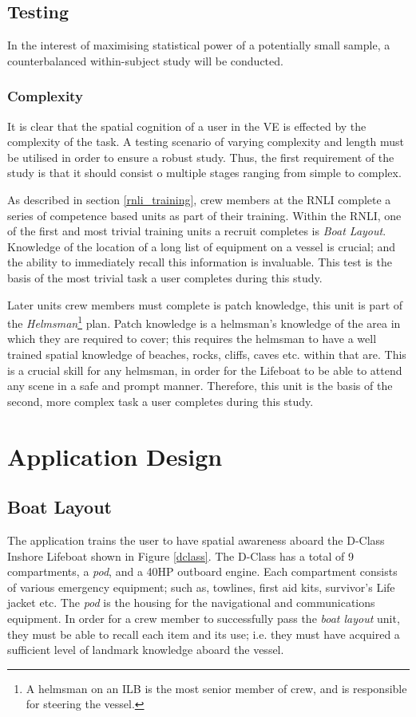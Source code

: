 \documentclass[a4paper, openright, twoside]{report}
\begin{document}
\subsection{Testing}
In the interest of maximising statistical power of a potentially small sample, a counterbalanced within-subject study will be conducted. 

\subsubsection{Complexity}
It is clear that the spatial cognition of a user in the VE is effected by the complexity of the task. A testing scenario of varying complexity and length must be utilised in order to ensure a robust study. Thus, the first requirement of the study is that it should consist o multiple stages ranging from simple to complex. 

As described in section \ref{rnli_training}, crew members at the RNLI complete a series of competence based units as part of their training.  Within the RNLI, one of the first and most trivial training units a recruit completes is \textit{Boat Layout}. Knowledge of the location of a long list of equipment on a vessel is crucial; and the ability to immediately recall this information is invaluable. This test is the basis of the most trivial task a user completes during this study. 

Later units crew members must complete is patch knowledge, this unit is part of the \textit{Helmsman}\footnote{A helmsman on an ILB is the most senior member of crew, and is responsible for steering the vessel.} plan. Patch knowledge is a helmsman's knowledge of the area in which they are required to cover; this requires the helmsman to have a well trained spatial knowledge of beaches, rocks, cliffs, caves etc. within that are. This is a crucial skill for any helmsman, in order for the Lifeboat to be able to attend any scene in a safe and prompt manner. Therefore, this unit is the basis of the second, more complex task a user completes during this study. 

\section{Application Design}
\subsection{Boat Layout}
The application trains the user to have spatial awareness aboard the D-Class Inshore Lifeboat shown in Figure \ref{dclass}. The D-Class has a total of 9 compartments, a \textit{pod}, and a 40HP outboard engine. Each compartment consists of various emergency equipment; such as, towlines, first aid kits, survivor's Life jacket etc. The \textit{pod} is the housing for the navigational and communications equipment. In order for a crew member to successfully pass the \textit{boat layout} unit, they must be able to recall each item and its use; i.e. they must have acquired a sufficient level of landmark knowledge aboard the vessel. 
\end{document}
